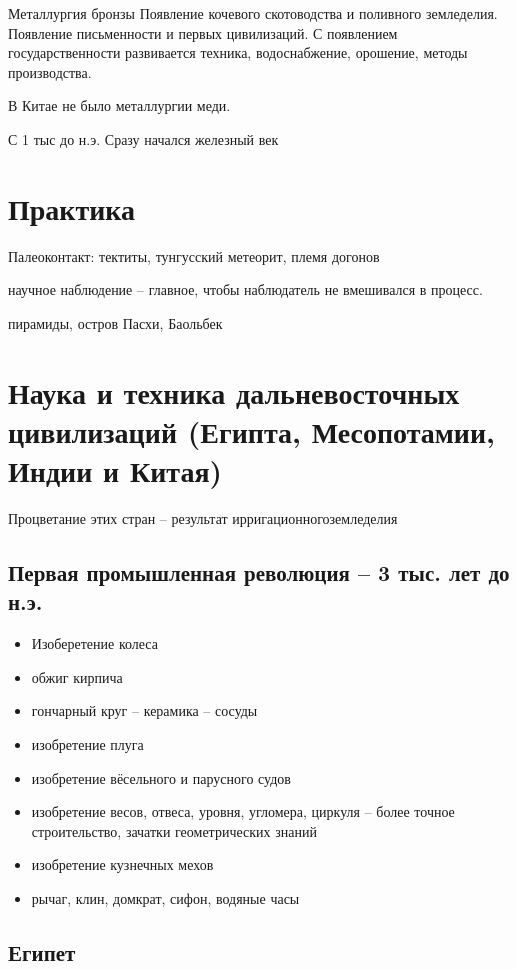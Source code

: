 \documentclass{book}
\theoremstyle{definition}
\begin{document}
    Металлургия бронзы Появление кочевого скотоводства и поливного земледелия. Появление письменности и первых цивилизаций. С появлением государственности развивается техника, водоснабжение, орошение, методы производства.

    В Китае не было металлургии меди.

    С 1 тыс до н.э. Сразу начался железный век
    \section{Практика}

    Палеоконтакт: тектиты, тунгусский метеорит, племя догонов

    научное наблюдение -- главное, чтобы наблюдатель не вмешивался в процесс.

   пирамиды, остров Пасхи, Баольбек

   \section{Наука и техника дальневосточных цивилизаций (Египта, Месопотамии, Индии и Китая)}

   Процветание этих стран -- результат ирригационногоземледелия
   \subsection{Первая промышленная революция -- 3 тыс. лет до н.э.}

   \begin{itemize}
       \item Изоберетение колеса
       \item обжиг кирпича
       \item гончарный круг -- керамика -- сосуды
       \item изобретение плуга
       \item изобретение вёсельного и парусного судов
       \item изобретение весов, отвеса, уровня, угломера, циркуля -- более точное строительство, зачатки геометрических знаний
       \item изобретение кузнечных мехов
       \item рычаг, клин, домкрат, сифон, водяные часы
   \end{itemize}

   \subsection{Египет}
\end{document}
